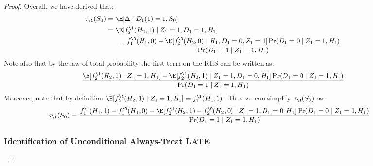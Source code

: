 \begin{proof}
Overall, we have derived that:
\begin{align*}
    \tau_{\1}(S_0) =~& \E[ \Delta \mid D_1(1)=1, S_0 ]\\
    =~& \E[f_2^{\1}(H_2, 1)\mid Z_1=1, D_1=1, H_1] \\
    &~ - \frac{f_1^{\0}(H_1, 0) - \E[f_2^{\0}(H_2, 0)\mid H_1, D_1=0, Z_1=1]\Pr(D_1=0\mid Z_1=1, H_1)}{\Pr(D_1=1\mid Z_1=1, H_1)}
\end{align*}
Note also that by the law of total probability the first term on the RHS can be written as:
\begin{align}
\frac{\E[f_2^{\1}(H_2, 1)\mid Z_1=1, H_1] - \E[f_2^{\1}(H_2, 1)\mid Z_1=1, D_1=0, H_1] \Pr(D_1=0\mid Z_1=1, H_1)}{\Pr(D_1=1\mid Z_1=1, H_1)}
\end{align}
Moreover, note that by definition $\E[f_2^{\1}(H_2, 1)\mid Z_1=1, H_1]=f_1^{\1}(H_1, 1)$.
Thus we can simplify $\tau_\1(S_0)$ as:
\begin{align*}
    \tau_{\1}(S_0)
    =~& \frac{f_1^{\1}(H_1,1) - f_1^{\0}(H_1, 0) - \E[f_2^{\1}(H_2, 1) - f_2^{\0}(H_2,0)\mid Z_1=1, D_1=0, H_1]\Pr(D_1=0\mid Z_1=1, H_1)}{\Pr(D_1=1\mid Z_1=1, H_1)}
\end{align*}

\subsubsection{Identification of Unconditional Always-Treat LATE}


\end{proof}
